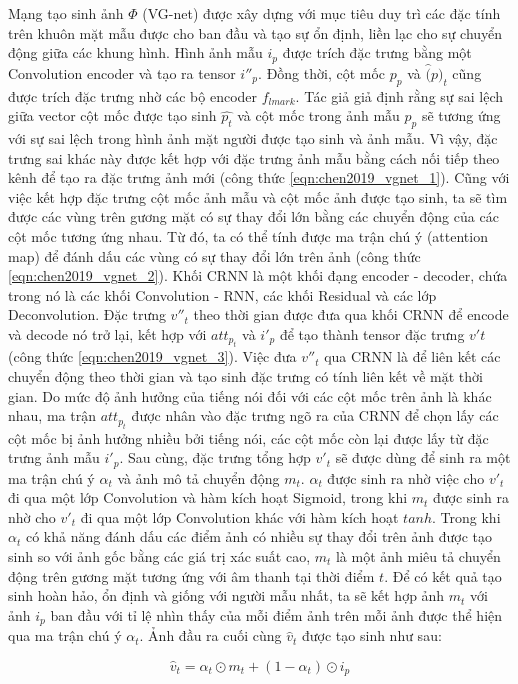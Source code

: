 Mạng tạo sinh ảnh $\Phi$ (VG-net) được xây dựng với mục tiêu duy trì các đặc tính trên khuôn mặt mẫu được cho ban đầu và tạo sự ổn định, liền lạc cho sự chuyển động giữa các khung hình. Hình ảnh mẫu $i_p$ được trích đặc trưng bằng một Convolution encoder và tạo ra tensor $i''_p$. Đồng thời, cột mốc $p_p$ và $\hat(p)_t$ cũng được trích đặc trưng nhờ các bộ encoder $f_{lmark}$. Tác giả giả định rằng sự sai lệch giữa vector cột mốc được tạo sinh $\hat{p_t}$ và cột mốc trong ảnh mẫu $p_p$ sẽ tương ứng với sự sai lệch trong hình ảnh mặt người được tạo sinh và ảnh mẫu. Vì vậy, đặc trưng sai khác này được kết hợp với đặc trưng ảnh mẫu bằng cách nối tiếp theo kênh để tạo ra đặc trưng ảnh mới (công thức \ref{eqn:chen2019_vgnet_1}). Cũng với việc kết hợp đặc trưng cột mốc ảnh mẫu và cột mốc ảnh được tạo sinh, ta sẽ tìm được các vùng trên gương mặt có sự thay đổi lớn bằng các chuyển động của các cột mốc tương ứng nhau. Từ đó, ta có thể tính được ma trận chú ý (attention map) để đánh dấu các vùng có sự thay đổi lớn trên ảnh (công thức \ref{eqn:chen2019_vgnet_2}). Khối CRNN là một khối đạng encoder - decoder, chứa trong nó là các khối Convolution - RNN, các khối Residual và các lớp Deconvolution. Đặc trưng $v''_t$ theo thời gian được đưa qua khối CRNN để encode và decode nó trở lại, kết hợp với $att_{p_t}$ và $i'_p$ để tạo thành tensor đặc trưng $v't$ (công thức \ref{eqn:chen2019_vgnet_3}). Việc đưa $v''_t$ qua CRNN là để liên kết các chuyển động theo thời gian và tạo sinh đặc trưng có tính liên kết về mặt thời gian. Do mức độ ảnh hưởng của tiếng nói đối với các cột mốc trên ảnh là khác nhau, ma trận $att_{p_t}$ được nhân vào đặc trưng ngõ ra của CRNN để chọn lấy các cột mốc bị ảnh hưởng nhiều bởi tiếng nói, các cột mốc còn lại được lấy từ đặc trưng ảnh mẫu $i'_p$. Sau cùng, đặc trưng tổng hợp $v'_t$ sẽ được dùng để sinh ra một ma trận chú ý $\alpha_t$ và ảnh mô tả chuyển động $m_t$. $\alpha_t$ được sinh ra nhờ việc cho $v'_t$ đi qua một lớp Convolution và hàm kích hoạt Sigmoid, trong khi $m_t$ được sinh ra nhờ cho $v'_t$ đi qua một lớp Convolution khác với hàm kích hoạt $tanh$. Trong khi $\alpha_t$ có khả năng đánh dấu các điểm ảnh có nhiều sự thay đổi trên ảnh được tạo sinh so với ảnh gốc bằng các giá trị xác suất cao, $m_t$ là một ảnh miêu tả chuyển động trên gương mặt tương ứng với âm thanh tại thời điểm $t$. Để có kết quả tạo sinh hoàn hảo, ổn định và giống với người mẫu nhất, ta sẽ kết hợp ảnh $m_t$ với ảnh $i_p$ ban đầu với tỉ lệ nhìn thấy của mỗi điểm ảnh trên mỗi ảnh được thể hiện qua ma trận chú ý $\alpha_t$. Ảnh đầu ra cuối cùng $\hat{v}_t$ được tạo sinh như sau: 

\begin{equation}
    \hat{v}_t = \alpha_t \odot m_t + (1 - \alpha_t) \odot i_p
\end{equation}
